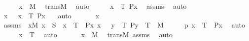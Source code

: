 \begin{isabellebody}
\ \ \isamarkupfalse%
\ \isamarkupfalse%
\ {\isachardoublequoteopen}x\ {\isasymin}\ M{\isachardoublequoteclose}\ \isamarkupfalse%
\ transM\ \isamarkupfalse%
\ auto\isanewline
\ \ \isamarkupfalse%
\ \isamarkupfalse%
\ {\isachardoublequoteopen}x\ {\isasymin}\ T{\isachardoublequoteclose}\ {\isachardoublequoteopen}P{\isacharparenleft}{\kern0pt}x{\isacharparenright}{\kern0pt}{\isachardoublequoteclose}\ \isamarkupfalse%
\ assms\ \isamarkupfalse%
\ auto\ \isanewline
\ \ \isamarkupfalse%
\ \isamarkupfalse%
\ {\isachardoublequoteopen}x\ {\isasymin}\ {\isacharbraceleft}{\kern0pt}\ x\ {\isasymin}\ T{\isachardot}{\kern0pt}\ P{\isacharparenleft}{\kern0pt}x{\isacharparenright}{\kern0pt}\ {\isacharbraceright}{\kern0pt}{\isachardoublequoteclose}\ \isamarkupfalse%
\ auto\ \isanewline
{}\isamarkupfalse%
\ \isanewline
\ \ \isamarkupfalse%
\ x\ \isamarkupfalse%
\ assms\ {\isacharcolon}{\kern0pt}\ {\isachardoublequoteopen}{\isasymforall}x{\isacharbrackleft}{\kern0pt}{\isacharhash}{\kern0pt}{\isacharhash}{\kern0pt}M{\isacharbrackright}{\kern0pt}{\isachardot}{\kern0pt}\ x\ {\isasymin}\ S\ {\isasymlongleftrightarrow}\ x\ {\isasymin}\ T\ {\isasymand}\ P{\isacharparenleft}{\kern0pt}x{\isacharparenright}{\kern0pt}{\isachardoublequoteclose}\ {\isachardoublequoteopen}x\ {\isasymin}\ {\isacharbraceleft}{\kern0pt}\ y\ {\isasymin}\ T{\isachardot}{\kern0pt}\ P{\isacharparenleft}{\kern0pt}y{\isacharparenright}{\kern0pt}\ {\isacharbraceright}{\kern0pt}{\isachardoublequoteclose}\ {\isachardoublequoteopen}T\ {\isasymin}\ M{\isachardoublequoteclose}\isanewline
\ \ \isamarkupfalse%
\ \isamarkupfalse%
\ p{}\ {\isacharcolon}{\kern0pt}{\isachardoublequoteopen}x\ {\isasymin}\ T\ {\isasymand}\ P{\isacharparenleft}{\kern0pt}x{\isacharparenright}{\kern0pt}{\isachardoublequoteclose}\ \isamarkupfalse%
\ auto\ \isanewline
\ \ \isamarkupfalse%
\ \isamarkupfalse%
\ {\isachardoublequoteopen}x\ {\isasymin}\ T{\isachardoublequoteclose}\ \isamarkupfalse%
\ auto\ \isanewline
\ \ \isamarkupfalse%
\ \isamarkupfalse%
\ {\isachardoublequoteopen}x\ {\isasymin}\ M{\isachardoublequoteclose}\ \isamarkupfalse%
\ transM\ assms\ \isamarkupfalse%
\ auto\ \isanewline
\ \ \isamarkupfalse%
\ \isamarkupfalse%

\end{isabellebody}
